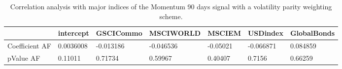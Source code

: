 \begin{table}[H]
\centering
\begin{tabular}{lllllll}
& intercept & GSCICommo & MSCIWORLD & MSCIEM & USDindex & GlobalBonds \\ 
\hline 
Coefficient AF & 0.0036008 & -0.013186 & -0.046536 & -0.05021 & -0.066871 & 0.084859 \\ 
pValue AF & 0.11011 & 0.71734 & 0.59967 & 0.40407 & 0.7156 & 0.66259 \\ 
\hline
\end{tabular}
\caption{Correlation analysis with major indices of the Momentum 90 days signal with a volatility parity weighting scheme.}
\label{MOM90VP_AFACTOR}
\end{table}
